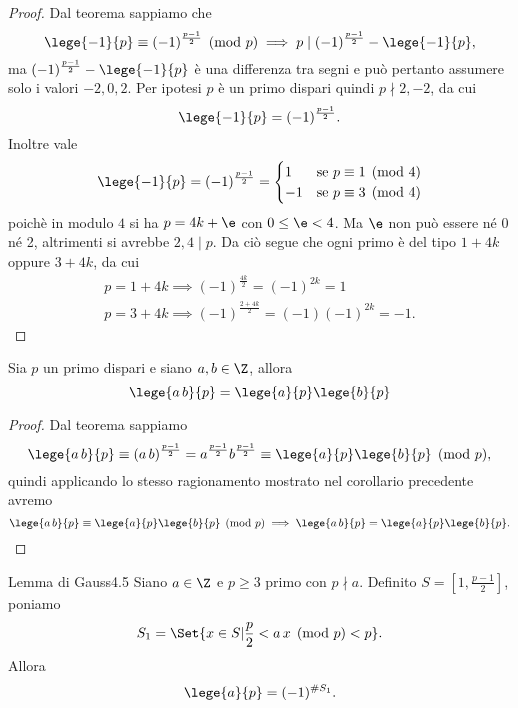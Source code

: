 \begin{proof}
	Dal teorema sappiamo che
	\[
		\lege{-1}{p} \equiv (-1)^{\frac{p-1}{2}} \pmod{p} \implies p \mid (-1)^{\frac{p-1}{2}}-\lege{-1}{p},
	\]
	ma \((-1)^{\frac{p-1}{2}}-\lege{-1}{p}\) è una differenza tra segni e può pertanto assumere solo i valori \(-2,0,2\).
	Per ipotesi \(p\) è un primo dispari quindi \(p\nmid 2,-2\), da cui
	\[
		\lege{-1}{p} = (-1)^{\frac{p-1}{2}}.\qedhere
	\]
	Inoltre vale
	\[
		\lege{-1}{p} = (-1)^{\frac{p-1}{2}} = 	\begin{cases}
			1  & \text{se }p \equiv 1 \pmod{4} \\
			-1 & \text{se }p \equiv 3 \pmod{4}
		\end{cases}
	\]
	poichè in modulo \(4\) si ha \(p=4k+\e\) con \(0\le \e <4\).
	Ma \(\e\) non può essere né 0 né 2, altrimenti si avrebbe \(2,4\mid p\).
	Da ciò segue che ogni primo è del tipo \(1+4k\) oppure \(3+4k\), da cui
	\begin{gather*}
		p=1+4k \implies (-1)^{\frac{4k}{2}} = (-1)^{2k} = 1\\
		p=3+4k \implies (-1)^{\frac{2+4k}{2}} = (-1)(-1)^{2k} = -1.
	\end{gather*}
\end{proof}

\begin{cor}\label{th:4.4}
	Sia \(p\) un primo dispari e siano \(a,b\in\Z\), allora
	\[
		\lege{a\,b}{p} = \lege{a}{p}\lege{b}{p}
	\]
\end{cor}

\begin{proof}
	Dal teorema sappiamo
	\[
		\lege{a\,b}{p} \equiv (a\,b)^{\frac{p-1}{2}} = a^{\frac{p-1}{2}}b^{\frac{p-1}{2}} \equiv \lege{a}{p}\lege{b}{p} \pmod{p},
	\]
	quindi applicando lo stesso ragionamento mostrato nel corollario precedente avremo
	\[
		\lege{a\,b}{p} \equiv \lege{a}{p}\lege{b}{p} \pmod{p} \implies \lege{a\,b}{p} = \lege{a}{p}\lege{b}{p}.\qedhere
	\]
\end{proof}
%
%
\begin{teor}{Lemma di Gauss}{4.5}
	Siano \(a\in \Z\) e \(p\ge 3\) primo con \(p\nmid a\).
	Definito \(S = \left[ 1,\frac{p-1}{2} \right]\), poniamo
	\[
		S_1 = \Set{x\in S | \frac{p}{2}<a\,x \pmod{p} < p}.
	\]
	Allora
	\[
		\lege{a}{p} = (-1)^{\#S_1}.
	\]
\end{teor}

